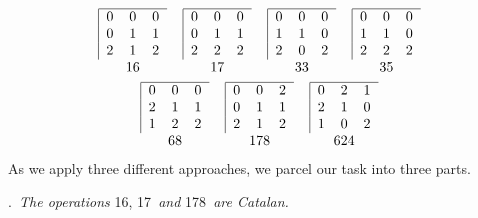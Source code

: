 \documentclass[a4paper,reqno]{amsart}\usepackage{amssymb,latexsym}
\theoremstyle{definition}
\theoremstyle{remark}
\numberwithin{equation}{section}
\numberwithin{theorem}{section}
\begin{document}
\begin{gather*}
\setlength{\tabcolsep}{0.2cm}\begin{tabular}
[c]{cccc}$\begin{tabular}
[c]{|ccc}\hline
$0$ & $0$ & $0$\\
$0$ & $1$ & $1$\\
$2$ & $1$ & $2$\end{tabular}
$ & $\begin{tabular}
[c]{|ccc}\hline
$0$ & $0$ & $0$\\
$0$ & $1$ & $1$\\
$2$ & $2$ & $2$\end{tabular}
$ & $\begin{tabular}
[c]{|ccc}\hline
$0$ & $0$ & $0$\\
$1$ & $1$ & $0$\\
$2$ & $0$ & $2$\end{tabular}
$ & $\begin{tabular}
[c]{|ccc}\hline
$0$ & $0$ & $0$\\
$1$ & $1$ & $0$\\
$2$ & $2$ & $2$\end{tabular}
$\\
$16$ & $17$ & $33$ & $35$\end{tabular}
\\
\setlength{\tabcolsep}{0.2cm}\begin{tabular}
[c]{ccc}$\begin{tabular}
[c]{|ccc}\hline
$0$ & $0$ & $0$\\
$2$ & $1$ & $1$\\
$1$ & $2$ & $2$\end{tabular}
$ & $\begin{tabular}
[c]{|ccc}\hline
$0$ & $0$ & $2$\\
$0$ & $1$ & $1$\\
$2$ & $1$ & $2$\end{tabular}
$ & $\begin{tabular}
[c]{|ccc}\hline
$0$ & $2$ & $1$\\
$2$ & $1$ & $0$\\
$1$ & $0$ & $2$\end{tabular}
$\\
$68$ & $178$ & $624$\end{tabular}
\end{gather*}
As we apply three different approaches, we parcel our task into three parts.

\bigskip

.\textit{\ The operations }16, 17\textit{\ and }178\textit{\ are
Catalan.}
\end{document}
